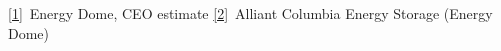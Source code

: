 \href{https://energydome.com/}{[1]}~Energy Dome, CEO estimate\quad
\href{https://www.alliantenergy.com/}{[2]}~Alliant Columbia Energy Storage (Energy Dome)

